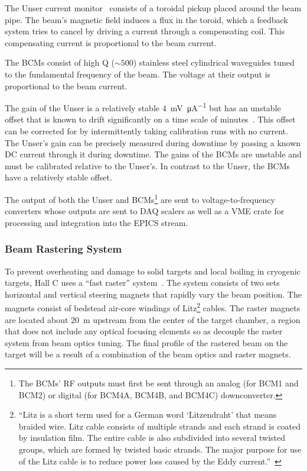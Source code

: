 The Unser current monitor~\cite{Unser_1991} consists of a toroidal pickup
placed around the beam pipe.
The beam's magnetic field induces a flux in the toroid, which a feedback system
tries to cancel by driving a current through a compensating coil.
This compensating current is proportional to the beam current.


The BCMs consist of high Q ($\sim 500$) stainless steel cylindrical waveguides
tuned to the fundamental frequency of the beam.
The voltage at their output is proportional to the beam current.


The gain of the Unser is a relatively stable
\SI{4}{\milli\volt\per\micro\ampere} but has an unstable offset that is known
to drift significantly on a time scale of
minutes~\cite{Standard_Equipment_Manual}.
This offset can be corrected for by intermittently taking calibration runs with
no current.
The Unser's gain can be precisely measured during downtime by passing a known
DC current through it during downtime.
The gains of the BCMs are unstable and must be calibrated relative to the
Unser's.
In contrast to the Unser, the BCMs have a relatively stable offset.


The output of both the Unser and BCMs\footnote{The BCMs' RF outputs must first
be sent through an analog (for BCM1 and BCM2) or digital (for BCM4A, BCM4B, and
BCM4C) downconverter.} are sent to voltage-to-frequency converters whose outputs
are sent to DAQ scalers as well as a VME crate for processing and integration
into the EPICS stream.

\subsubsection{Beam Rastering System}
To prevent overheating and damage to solid targets and local boiling in
cryogenic targets, Hall C uses a ``fast raster'' system~\cite{Yan_2005}.
The system consists of two sets horizontal and vertical steering magnets
that rapidly vary the beam position.
The magnets consist of bedstead air-core windings of Litz\footnote{``Litz is a
short term used for a German word ‘Litzendraht’ that means braided wire. Litz
cable consists of multiple strands and each strand is coated by insulation
film. The entire cable is also subdivided into several twisted groups, which
are formed by twisted basic strands. The major purpose for use of the Litz
cable is to reduce power loss caused by the Eddy current.''~\cite{Yan_2005}}
cables.
The raster magnets are located about \SI{20}{\meter} upstream from the center
of the target chamber, a region that does not include any optical focusing
elements so as decouple the raster system from beam optics tuning.
The final profile of the rastered beam on the target will be a result of a
combination of the beam optics and raster magnets.


